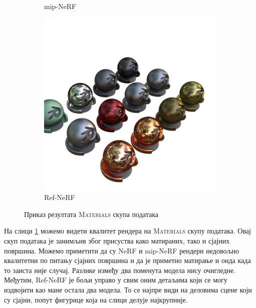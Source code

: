 \documentclass[12pt, a4paper, twoside]{book}
\numberwithin{equation}{chapter}
\numberwithin{theorem}{section}
\numberwithin{definition}{section}
\numberwithin{definitionChapter}{chapter}
\begin{document}
\begin{figure}[H]
\begin{subfigure}{0.475\textwidth}
			\caption{mip-NeRF}
		\end{subfigure}
		\begin{subfigure}{0.475\textwidth}
			\centering
			\includegraphics[scale=0.25]{img/refnerf/refnerf_materials_36.jpg}
			\caption{Ref-NeRF}
		\end{subfigure}
		\caption{Приказ резултата \textsc{Materials} скупа података}
		\label{fig-materials-results}
	\end{figure}

На слици \ref{fig-materials-results} можемо видети квалитет рендера на \textsc{Materials} скупу података.
Овај скуп података је занимљив због присуства како матираних, тако и сјајних површина. Можемо приметити 
да су NeRF и mip-NeRF рендери недовољно квалитетни по питању сјајних површина и да је приметно матирање
и онда када то заиста није случај. Разлике између два поменута модела нису очигледне. Међутим, Ref-NeRF
је бољи управо у свим оним детаљима који се могу издвојити као мане остала два модела. То се најпре види
на деловима сцене који су сјајни, попут фигурице која на слици делује најкрупније.
\end{document}
